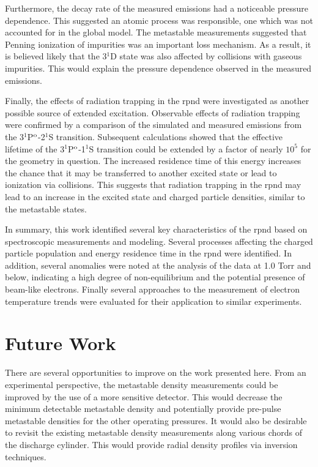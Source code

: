 Furthermore, the decay rate of the measured emissions had a noticeable pressure
dependence. This suggested an atomic process was responsible, one which was not
accounted for in the global model. The metastable measurements suggested that
Penning ionization of impurities was an important loss mechanism. As a result,
it is believed likely that the 3$^1$D state was also affected by collisions with
gaseous impurities. This would explain the pressure dependence observed in the
measured emissions.

Finally, the effects of radiation trapping in the \acs{rpnd} were investigated
as another possible source of extended excitation. Observable effects of
radiation trapping were confirmed by a comparison of the simulated and measured
emissions from the 3$^1$P$^\mathrm{o}$-2$^1$S transition. Subsequent calculations
showed that the effective lifetime of the 3$^1$P$^\mathrm{o}$-1$^1$S transition could
be extended by a factor of nearly $10^5$ for the geometry in question. The
increased residence time of this energy increases the chance that it may be
transferred to another excited state or lead to ionization via collisions.
This suggests that radiation trapping in the \acs{rpnd} may lead to an increase
in the excited state and charged particle densities, similar to the metastable
states.

In summary, this work identified several key characteristics of the \acs{rpnd}
based on spectroscopic measurements and modeling. Several processes affecting
the charged particle population and energy residence time in the \acs{rpnd} were
identified. In addition, several anomalies were noted at the analysis of the
data at 1.0 Torr and below, indicating a high degree of non-equilibrium and the
potential presence of beam-like electrons. Finally several approaches to the
measurement of electron temperature trends were evaluated for their application
to similar experiments.

\section{Future Work}

There are several opportunities to improve on the work presented here. From an
experimental perspective, the metastable density measurements could be improved
by the use of a more sensitive detector. This would decrease the minimum
detectable metastable density and potentially provide pre-pulse metastable
densities for the other operating pressures. It would also be desirable to
revisit the existing metastable density measurements along various chords of the
discharge cylinder. This would provide radial density profiles via inversion
techniques.

